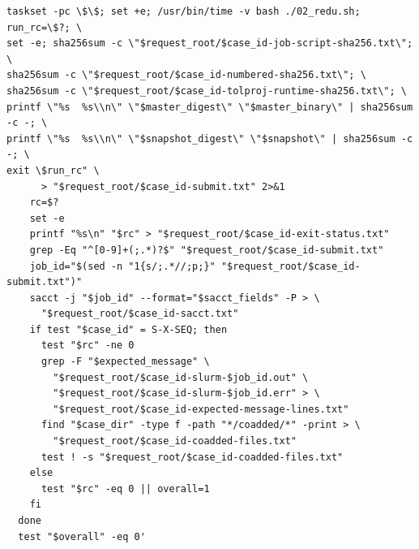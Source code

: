 \documentclass[11pt]{article}
\begin{document}
\begin{small}
\begin{verbatim}
taskset -pc \$\$; set +e; /usr/bin/time -v bash ./02_redu.sh; run_rc=\$?; \
set -e; sha256sum -c \"$request_root/$case_id-job-script-sha256.txt\"; \
sha256sum -c \"$request_root/$case_id-numbered-sha256.txt\"; \
sha256sum -c \"$request_root/$case_id-tolproj-runtime-sha256.txt\"; \
printf \"%s  %s\\n\" \"$master_digest\" \"$master_binary\" | sha256sum -c -; \
printf \"%s  %s\\n\" \"$snapshot_digest\" \"$snapshot\" | sha256sum -c -; \
exit \$run_rc" \
      > "$request_root/$case_id-submit.txt" 2>&1
    rc=$?
    set -e
    printf "%s\n" "$rc" > "$request_root/$case_id-exit-status.txt"
    grep -Eq "^[0-9]+(;.*)?$" "$request_root/$case_id-submit.txt"
    job_id="$(sed -n "1{s/;.*//;p;}" "$request_root/$case_id-submit.txt")"
    sacct -j "$job_id" --format="$sacct_fields" -P > \
      "$request_root/$case_id-sacct.txt"
    if test "$case_id" = S-X-SEQ; then
      test "$rc" -ne 0
      grep -F "$expected_message" \
        "$request_root/$case_id-slurm-$job_id.out" \
        "$request_root/$case_id-slurm-$job_id.err" > \
        "$request_root/$case_id-expected-message-lines.txt"
      find "$case_dir" -type f -path "*/coadded/*" -print > \
        "$request_root/$case_id-coadded-files.txt"
      test ! -s "$request_root/$case_id-coadded-files.txt"
    else
      test "$rc" -eq 0 || overall=1
    fi
  done
  test "$overall" -eq 0'


\end{verbatim}
\end{small}
\end{document}

